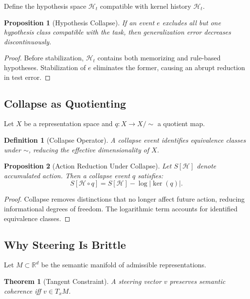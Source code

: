 \documentclass[11pt]{article}
\newtheorem{definition}{Definition}
\newtheorem{proposition}{Proposition}
\newtheorem{theorem}{Theorem}
\theoremstyle{remark}
\newcommand{\Hist}{\mathcal{H}}
\begin{document}
Define the hypothesis space $\mathcal{H}_t$ compatible with kernel
history $\Hist_t$.

\begin{proposition}[Hypothesis Collapse]
If an event $e$ excludes all but one hypothesis class compatible with
the task, then generalization error decreases discontinuously.
\end{proposition}

\begin{proof}
Before stabilization, $\mathcal{H}_t$ contains both memorizing and
rule-based hypotheses. Stabilization of $e$ eliminates the former,
causing an abrupt reduction in test error.
\end{proof}

\subsection{Collapse as Quotienting}

Let $X$ be a representation space and $q : X \to X/{\sim}$ a quotient
map.

\begin{definition}[Collapse Operator]
A collapse event identifies equivalence classes under $\sim$, reducing
the effective dimensionality of $X$.
\end{definition}

\begin{proposition}[Action Reduction Under Collapse]
Let $S[\Hist]$ denote accumulated action. Then a collapse event $q$
satisfies:
\[
S[\Hist \circ q] = S[\Hist] - \log |\ker(q)|.
\]
\end{proposition}

\begin{proof}
Collapse removes distinctions that no longer affect future action,
reducing informational degrees of freedom. The logarithmic term
accounts for identified equivalence classes.
\end{proof}

\subsection{Why Steering Is Brittle}

Let $M \subset \mathbb{R}^d$ be the semantic manifold of admissible
representations.

\begin{theorem}[Tangent Constraint]
A steering vector $v$ preserves semantic coherence iff
$v \in T_x M$.
\end{theorem}
\end{document}

